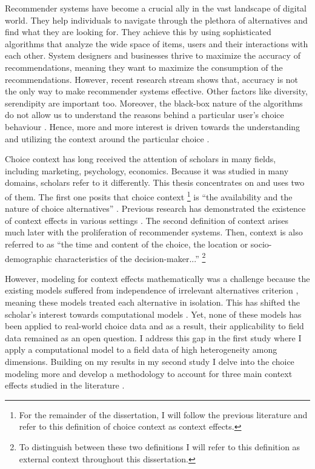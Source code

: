 \documentclass[a4paper,12pt]{article}
\begin{document}
Recommender systems have become a crucial ally in the vast landscape of digital world. They help individuals to navigate through the plethora of alternatives and find what they are looking for. They achieve this by using sophisticated algorithms that analyze the wide space of items, users and their interactions with each other. System designers and businesses thrive to maximize the accuracy of recommendations, meaning they want to maximize the consumption of the recommendations. However, recent research stream shows that, accuracy is not the only way to make recommender systems effective. Other factors like diversity, serendipity are important too\citep{kaminskas2016diversity}. Moreover, the black-box nature of the algorithms do not allow us to understand the reasons behind a particular user's choice behaviour \citep{kotkovSurveySerendipityRecommender2016, samih2021exmrec2vec}. Hence, more and more interest is driven towards the understanding and utilizing the context around the particular choice \citep{adomavicius2005toward}.

Choice context has long received the attention of scholars in many fields, including marketing, psychology, economics. Because it was studied in many domains, scholars refer to it differently. This thesis concentrates on and uses two of them. The first one posits that choice context \footnote{For the remainder of the dissertation, I will follow the previous literature \citep{truebloodEtAl13} and refer to this definition of choice context as context effects.} is ``the availability and the nature of choice alternatives'' \citep{tversky1972elimination, huberEtAl82, simonson89}. Previous research has demonstrated the existence of context effects in various settings \citep{herne1997decoy, soltani2012range, evangelidisEtAl18,  wuConsguner20}. The second definition of context arises much later with the proliferation of recommender systems. Then, context is also referred to as ``the time and content of the choice, the location or socio-demographic characteristics of the decision-maker...'' \citep{adomavicius2011context}\footnote{To distinguish between these two definitions I will refer to this definition as external context throughout this dissertation.}

However, modeling for context effects mathematically was a challenge because the existing models suffered from independence of irrelevant alternatives criterion \citep{luce59}, meaning these models treated each alternative in isolation. This has shifted the scholar's interest towards computational models \citep{usher2001time, roe2001multialternative, trueblood2014multiattribute, noguchi2018multialternative}. Yet, none of these models has been applied to real-world choice data and as a result, their applicability to field data remained as an open question. I address this gap in the first study where I apply a computational model to a field data of high heterogeneity among dimensions. Building on my results in my second study I delve into the choice modeling more and develop a methodology to account for three main context effects studied in the literature \citep{truebloodEtAl13}. 
\end{document}
